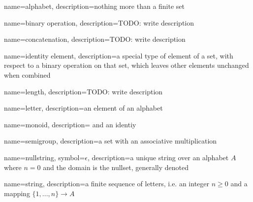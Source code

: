 {
  name=alphabet,
  description={nothing more than a finite set}
}

{
  name={binary operation},
  description={TODO: write description}
}

{
  name=concatenation,
  description={TODO: write description}
}

{
  name={identity element},
  description={a special type of element of a set, with respect to a
  \gls{binary operation} on that set, which leaves other elements unchanged
  when combined}
}


{
  name=length,
  description={TODO: write description}
}

{
  name=letter,
  description={an element of an \gls{alphabet}}
}

{
  name=monoid,
  description={ and an identiy}
}

{
  name=semigroup,
  description={a set with an associative multiplication}
}


{
  name=nullstring,
  symbol={$\epsilon$},
  description={a unique \gls{string} over an \gls{alphabet} $A$ where $n = 0$
  and the domain is the nullset, generally denoted }
}


{
  name=string,
  description={a finite sequence of \glspl{letter}, i.e. an integer $n \geq 0$
  and a mapping $\{1,...,n\} \to A$}
}
